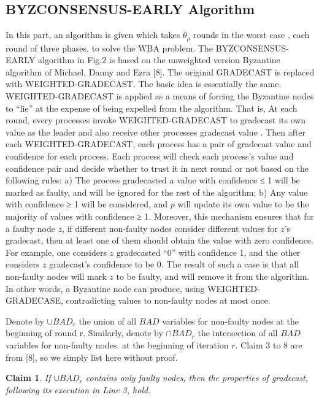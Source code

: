 \documentclass[conference]{IEEEtran}
\newtheorem{claim*}{Claim}
\begin{document}
\subsection{BYZCONSENSUS-EARLY Algorithm}
In this part, an algorithm is given which takes $\theta_\rho$ rounds in the worst case , each round of three phases, to solve the WBA problem.  
The BYZCONSENSUS-EARLY algorithm in Fig.2 is based on the unweighted version Byzantine algorithm of Michael, Danny and Ezra [8]. The original GRADECAST is replaced with WEIGHTED-GRADECAST. The basic idea is essentially the same.
WEIGHTED-GRADECAST is applied as a means of forcing the Byzantine nodes to “lie” at the expense of being expelled from the algorithm. That is, At each round, every processes invoke WEIGHTED-GRADECAST to gradecast its own value as the leader and also receive other processes gradecast value . Then after each WEIGHTED-GRADECAST, each process has a pair of gradecast value and confidence for each process. Each process will check each process's value and confidence pair and decide whether to trust it in next round or not based on the following rules: a)  The process gradecasted a value with confidence ≤ 1 will be marked as faulty, and will be ignored for the rest of the algorithm; b) Any value with confidence ≥ 1 will be considered, and $p$ will update its own value to be the majority of values with confidence ≥ 1. Moreover, this mechanism ensures that for a faulty node $z$, if different non-faulty nodes consider different values for $z$'s gradecast, then at least one of them should obtain the value with zero confidence. For example, one considers
$z$ gradecasted “0” with confidence 1, and the other considers $z$ gradecast’s confidence to be 0. The result of such a case is that all non-faulty nodes will mark $z$ to be faulty, and will remove it from
the algorithm. In other words, a Byzantine node can produce, using WEIGHTED-GRADECASE, contradicting values to non-faulty nodes at most once. 


Denote by $\cup BAD_r$ the union of all $BAD$ variables for non-faulty nodes at the beginning of round r. Similarly, denote by $\cap BAD_r$ the intersection of all $BAD$ variables for non-faulty nodes.
at the beginning of iteration $r$. Claim 3 to 8 are from [8], so we simply list here without proof. 

\begin{claim*}
If $\cup BAD_r$ contains only faulty nodes, then the properties of gradecast, following its execution in Line 3, hold.
\end{claim*}
\end{document}

